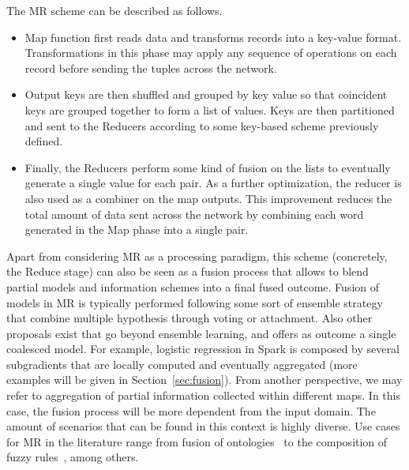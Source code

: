 \documentclass[3p,review]{elsarticle}
\begin{document}
	The MR scheme can be described as follows. 
	
	\begin{itemize}
		\item Map function first reads data and transforms records into a key-value format. Transformations in this phase may apply any sequence of operations on each record before sending the tuples across the network. 
		\item Output keys are then shuffled and grouped by key value so that coincident keys are grouped together to form a list of values. Keys are then partitioned and sent to the Reducers according to some key-based scheme previously defined. 
		\item Finally, the Reducers perform some kind of fusion on the lists to eventually generate a single value for each pair. As a further optimization, the reducer is also used as a combiner on the map outputs. This improvement reduces the total amount of data sent across the network by combining each word generated in the Map phase into a single pair.
	\end{itemize}
	
	
	Apart from considering MR as a processing paradigm, this scheme (concretely, the Reduce stage) can also be seen as a fusion process that allows to blend partial models and information schemes into a final fused outcome. Fusion of models in MR is typically performed following some sort of ensemble strategy that combine multiple hypothesis through voting or attachment. Also other proposals exist that go beyond ensemble learning, and offers as outcome a single coalesced model. For example, logistic regression in Spark is composed by several subgradients that are locally computed and eventually aggregated (more examples will be given in Section~\ref{sec:fusion}). From another perspective, we may refer to aggregation of partial information collected within different maps. In this case, the fusion process will be more dependent from the input domain. The amount of scenarios that can be found in this context is highly diverse. Use cases for MR in the literature range from fusion of ontologies~\cite{zhang14b} to the composition of fuzzy rules~\cite{rio15b}, among others.
	
\end{document}
